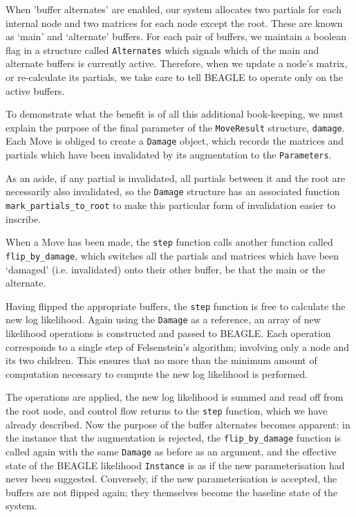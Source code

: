 \documentclass[10pt,journal,compsoc]{IEEEtran}
\begin{document}
When 'buffer alternates' are enabled, our system allocates two partials for each internal node and two matrices for each node except the root. These are known as `main' and `alternate' buffers. For each pair of buffers, we maintain a boolean flag in a structure called \texttt{Alternates} which signals which of the main and alternate buffers is currently active. Therefore, when we update a node's matrix, or re-calculate its partials, we take care to tell BEAGLE to operate only on the active buffers.

To demonstrate what the benefit is of all this additional book-keeping, we must explain the purpose of the final parameter of the \texttt{MoveResult} structure, \texttt{damage}. Each Move is obliged to create a \texttt{Damage} object, which records the matrices and partials which have been invalidated by its augmentation to the \texttt{Parameters}.

As an aside, if any partial is invalidated, all partials between it and the root are necessarily also invalidated, so the \texttt{Damage} structure has an associated function \texttt{mark\_partials\_to\_root} to make this particular form of invalidation easier to inscribe.

When a Move has been made, the \texttt{step} function calls another function called \texttt{flip\_by\_damage}, which switches all the partials and matrices which have been `damaged' (i.e. invalidated) onto their other buffer, be that the main or the alternate.

Having flipped the appropriate buffers, the \texttt{step} function is free to calculate the new log likelihood. Again using the \texttt{Damage} as a reference, an array of new likelihood operations is constructed and passed to BEAGLE. Each operation corresponds to a single step of Felsenstein's algorithm; involving only a node and its two children. This ensures that no more than the minimum amount of computation necessary to compute the new log likelihood is performed.

The operations are applied, the new log likelihood is summed and read off from the root node, and control flow returns to the \texttt{step} function, which we have already described. Now the purpose of the buffer alternates becomes apparent: in the instance that the augmentation is rejected, the \texttt{flip\_by\_damage} function is called again with the same \texttt{Damage} as before as an argument, and the effective state of the BEAGLE likelihood \texttt{Instance} is as if the new parameterisation had never been suggested. Conversely, if the new parameterisation is accepted, the buffers are not flipped again; they themselves become the baseline state of the system.
\end{document}
